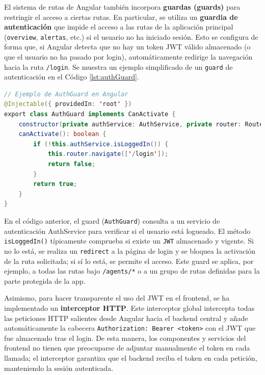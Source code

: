 \documentclass[11pt,a4paper,twoside]{report}
\begin{document}
El sistema de rutas de Angular también incorpora \textbf{guardas (guards)} para restringir el acceso a ciertas rutas. En particular, se utiliza un \textbf{guardia de autenticación} que impide el acceso a las rutas de la aplicación principal (\texttt{overview}, \texttt{alertas}, etc.) si el usuario no ha iniciado sesión. Esto se configura de forma que, si Angular detecta que no hay un token JWT válido almacenado (o que el usuario no ha pasado por login), automáticamente redirige la navegación hacia la ruta \texttt{/login}. Se muestra un ejemplo simplificado de un \texttt{guard} de autenticación en el Código \ref{lst:authGuard}.

\newpage

\begin{lstlisting}[language=Java, caption={Ejemplo simplificado de authGuard.}, label={lst:authGuard}]
// Ejemplo de AuthGuard en Angular
@Injectable({ providedIn: 'root' })
export class AuthGuard implements CanActivate {
	constructor(private authService: AuthService, private router: Router) {}
	canActivate(): boolean {
		if (!this.authService.isLoggedIn()) {
			this.router.navigate(['/login']);
			return false;
		}
		return true;
	}
}

\end{lstlisting}

En el código anterior, el guard (\texttt{AuthGuard}) consulta a un servicio de autenticación AuthService para verificar si el usuario está logueado. El método \texttt{isLoggedIn()} típicamente comprueba si existe un \texttt{JWT} almacenado y vigente. Si no lo está, se realiza un \texttt{redirect} a la página de login y se bloquea la activación de la ruta solicitada; si sí lo está, se permite el acceso. Este guard se aplica, por ejemplo, a todas las rutas bajo \texttt{/agents/*} o a un grupo de rutas definidas para la parte protegida de la app.\newline

Asimismo, para hacer transparente el uso del JWT en el frontend, se ha implementado un \textbf{interceptor HTTP}. Este interceptor global intercepta todas las peticiones HTTP salientes desde Angular hacia el backend central y añade automáticamente la cabecera \texttt{Authorization: Bearer <token>} con el JWT que fue almacenado tras el login. De esta manera, los componentes y servicios del frontend no tienen que preocuparse de adjuntar manualmente el token en cada llamada; el interceptor garantiza que el backend reciba el token en cada petición, manteniendo la sesión autenticada.\newline
\end{document}
